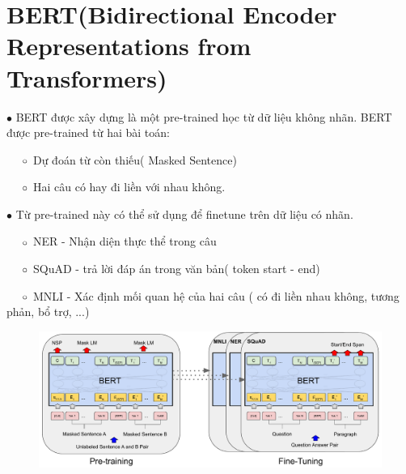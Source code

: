 \documentclass[final,letterpaper,twoside,12pt]{report}
\begin{document}
\begin{center}
\end{center}
\chapter{BERT(Bidirectional Encoder Representations from Transformers)}

$\bullet$ BERT được xây dựng là một pre-trained học từ dữ liệu không nhãn. BERT được pre-trained từ hai bài toán:

$\hspace*{0.5cm} \circ$ Dự đoán từ còn thiếu( Masked Sentence)

$\hspace*{0.5cm} \circ$ Hai câu có hay đi liền với nhau không.

$\bullet$ Từ pre-trained này có thể sử dụng để finetune trên dữ liệu có nhãn.

$\hspace*{0.5cm} \circ$ NER - Nhận diện thực thể trong câu

$\hspace*{0.5cm} \circ$ SQuAD - trả lời đáp án trong văn bản( token start - end)

$\hspace*{0.5cm} \circ$ MNLI - Xác định mối quan hệ của hai câu ( có đi liền nhau không, tương phản, bổ trợ, ...)

\begin{figure}[h]
	\begin{center}
		\includegraphics[width=1\textwidth]{BERT_Overall.pdf}
	\end{center}
\end{figure}
\end{document}
